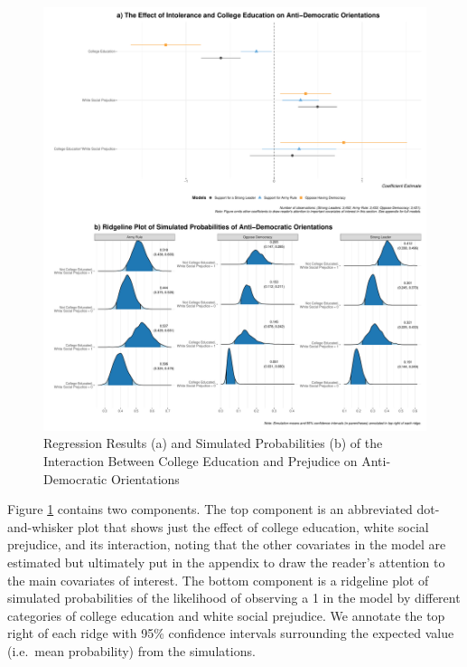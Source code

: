 \documentclass[11pt,]{article}
\begin{document}
\begin{figure}
\centering
\includegraphics{figs/educ_interactplot.pdf}
\caption{\label{fig:interplot}Regression Results (a) and Simulated
Probabilities (b) of the Interaction Between College Education and
Prejudice on Anti-Democratic Orientations}
\end{figure}

Figure \ref{fig:interplot} contains two components. The top component is
an abbreviated dot-and-whisker plot that shows just the effect of
college education, white social prejudice, and its interaction, noting
that the other covariates in the model are estimated but ultimately put
in the appendix to draw the reader's attention to the main covariates of
interest. The bottom component is a ridgeline plot of simulated
probabilities of the likelihood of observing a 1 in the model by
different categories of college education and white social prejudice. We
annotate the top right of each ridge with 95\% confidence intervals
surrounding the expected value (i.e.~mean probability) from the
simulations.
\end{document}
